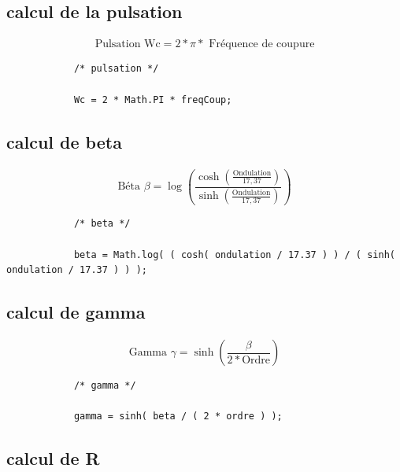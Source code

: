 \documentclass[a4paper,11pt]{article}
\begin{document}
    \clearpage

    \subsection{calcul de la pulsation}
        \paragraph{}
        \[ \mbox{Pulsation Wc} = 2 * \pi * \mbox{ Fréquence de coupure}\]
        \begin{lstlisting}
            /* pulsation */

            Wc = 2 * Math.PI * freqCoup;

        \end{lstlisting}

    \subsection{calcul de beta}
        \paragraph{}
        \[ \mbox{Béta } \beta = \log( \frac{ \cosh( \frac{ \mbox{Ondulation} }{17,37} ) } { \sinh( \frac{ \mbox{Ondulation} }{17,37} ) } )\]
        \begin{lstlisting}
            /* beta */

            beta = Math.log( ( cosh( ondulation / 17.37 ) ) / ( sinh( ondulation / 17.37 ) ) );

        \end{lstlisting}

    \subsection{calcul de gamma}
        \paragraph{}
        \[ \mbox{Gamma } \gamma = \sinh( \frac{ \beta }{ 2 * \mbox{Ordre} } ) \]
        \begin{lstlisting}
            /* gamma */

            gamma = sinh( beta / ( 2 * ordre ) );

        \end{lstlisting}

    \clearpage

    \subsection{calcul de R}
\end{document}
